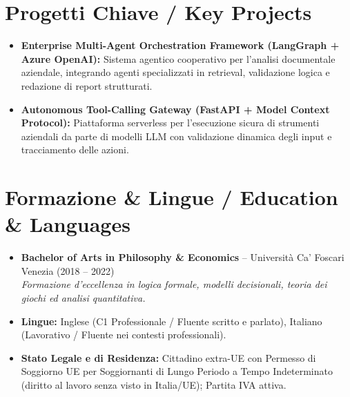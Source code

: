 \documentclass[a4paper,10pt]{article}
\begin{document}
\section{Progetti Chiave / Key Projects}
\begin{itemize}
  \item \textbf{Enterprise Multi-Agent Orchestration Framework (LangGraph + Azure OpenAI):} Sistema agentico cooperativo per l'analisi documentale aziendale, integrando agenti specializzati in retrieval, validazione logica e redazione di report strutturati.
  \item \textbf{Autonomous Tool-Calling Gateway (FastAPI + Model Context Protocol):} Piattaforma serverless per l'esecuzione sicura di strumenti aziendali da parte di modelli LLM con validazione dinamica degli input e tracciamento delle azioni.
\end{itemize}

\section{Formazione \& Lingue / Education \& Languages}
\begin{itemize}
  \item \textbf{Bachelor of Arts in Philosophy \& Economics} -- Università Ca' Foscari Venezia (2018 -- 2022) \\
  \textit{Formazione d'eccellenza in logica formale, modelli decisionali, teoria dei giochi ed analisi quantitativa.}
  \item \textbf{Lingue:} Inglese (C1 Professionale / Fluente scritto e parlato), Italiano (Lavorativo / Fluente nei contesti professionali).
  \item \textbf{Stato Legale e di Residenza:} Cittadino extra-UE con Permesso di Soggiorno UE per Soggiornanti di Lungo Periodo a Tempo Indeterminato (diritto al lavoro senza visto in Italia/UE); Partita IVA attiva.
\end{itemize}
\end{document}
